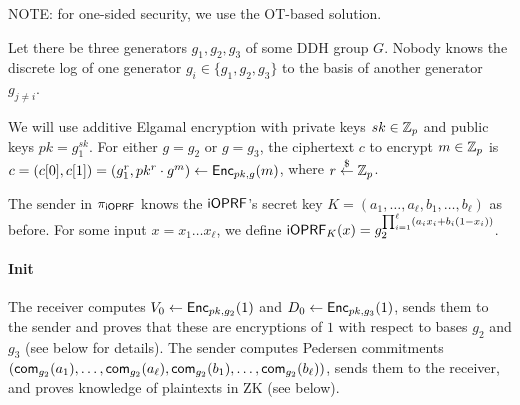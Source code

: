 \documentclass{article}
\begin{document}
NOTE: for one-sided security, we use the OT-based solution.

Let there be three generators $g_1,g_2,g_3$ of some DDH group $G$. Nobody
knows the discrete log of one generator $g_i\in\{g_1,g_2,g_3\}$ to
the basis of another generator $g_{j\neq{}i}$.

We will use additive Elgamal encryption with private keys $sk\in\mathbb{Z}_p$
and public keys $pk=g_1^{sk}$. For either $g=g_2$ or $g=g_3$, the
ciphertext $c$ to encrypt $m\in\mathbb{Z}_p$ is
$c=(c[0],c[1])=(g_1^r,pk^r\cdot{}g^m)\leftarrow{\mathsf{Enc}}_{pk,g}(m)$, where
$r\stackrel{\$}{\leftarrow}\mathbb{Z}_p$.

The sender in ${\pi_{\mathsf{i}\mathsf{OPRF}}}$ knows the $\mathsf{i}\mathsf{OPRF}$'s secret key
$K=(a_1,\ldots,a_\ell,b_1,\ldots,b_\ell)$ as before. For some input
$x=x_1\ldots{}x_\ell$, we define
$\mathsf{i}\mathsf{OPRF}_K(x)=g_2^{\prod_{i=1}^{\ell}(a_ix_i+b_i(1-x_i))}$.

\paragraph{Init}
The receiver computes $V_0 \leftarrow{\mathsf{Enc}}_{pk,g_2}(1)$ and
$D_0\leftarrow{\mathsf{Enc}}_{pk,g_3}(1)$, sends them to the sender and proves
that these are encryptions of $1$ with respect to bases $g_2$ and
$g_3$ (see below for details). The sender computes Pedersen
commitments
$(\mathsf{com}_{g_2}(a_1),\ldots,\mathsf{com}_{g_2}(a_\ell),\mathsf{com}_{g_2}(b_1),\ldots,\mathsf{com}_{g_2}(b_\ell))$,
sends them to the receiver, and proves knowledge of plaintexts in ZK
(see below).
\end{document}
